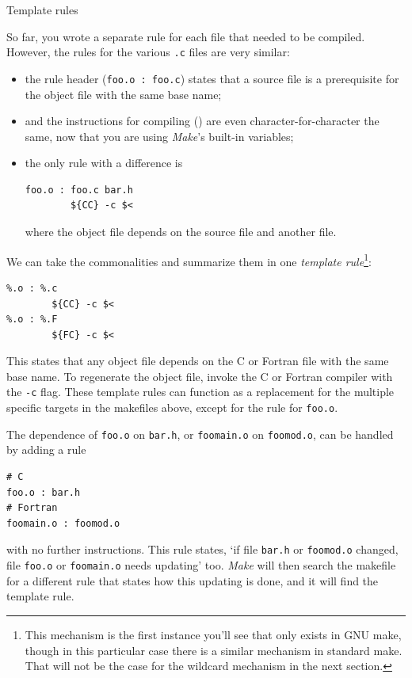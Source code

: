  {Template rules}
\label{sec:make-template}

So far, you wrote a separate rule for each file that
needed to be compiled. However, the rules for the various \lstinline{.c}
files are very similar:
\begin{itemize}
\item the rule header (\lstinline{foo.o : foo.c}) states that a source file is a
  prerequisite for the object file with the same base name;
\item and the instructions for compiling () 
  are even character-for-character the
  same, now that you are using \emph{Make}'s built-in variables;
\item the only rule with a difference is 
\begin{lstlisting}
foo.o : foo.c bar.h
        ${CC} -c $<
\end{lstlisting}
  where the object file depends on the source file and another file.
\end{itemize}
We can take the commonalities and summarize them in one 
\emph{template rule}\footnote
{This mechanism is the first instance you'll see that only exists in
  GNU make, though in this particular case there is a similar
  mechanism in standard make. That will not be the case for the
  wildcard mechanism in the next section.}:
\begin{lstlisting}
%.o : %.c
        ${CC} -c $<
%.o : %.F
        ${FC} -c $<
\end{lstlisting}
This states that any object file depends on the C or Fortran file with
the same base name. To regenerate the object file, invoke the C or
Fortran compiler with the \lstinline{-c} flag.
These template rules can function as a replacement for the multiple
specific targets in the makefiles above, except for the rule for \lstinline{foo.o}.

The dependence of \lstinline{foo.o} on \lstinline{bar.h}, or \lstinline{foomain.o} on
\lstinline{foomod.o}, can be handled by adding a rule
\begin{lstlisting}
# C
foo.o : bar.h
# Fortran
foomain.o : foomod.o
\end{lstlisting}
with no further instructions. This rule states, `if file
\lstinline{bar.h} or \lstinline{foomod.o} changed, file \lstinline{foo.o} or \lstinline{foomain.o}
needs updating' too. \emph{Make} will
then search the makefile for a different
rule that states how this updating is done, and it will find the
template rule.

